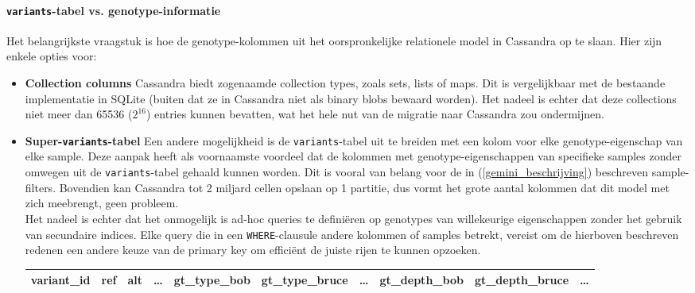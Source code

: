\paragraph{\texttt{variants}-tabel vs. genotype-informatie}

Het belangrijkste vraagstuk is hoe de genotype-kolommen uit het oorspronkelijke relationele model in Cassandra op te slaan. Hier zijn enkele opties voor:

\begin{itemize}

\item \textbf{Collection columns} Cassandra biedt zogenaamde collection types, zoals sets, lists of maps. Dit is vergelijkbaar met de bestaande implementatie in SQLite (buiten dat ze in Cassandra niet als binary blobs bewaard worden). Het nadeel is echter dat deze collections niet meer dan 65536 ($2^{16}$) entries kunnen bevatten, wat het hele nut van de migratie naar Cassandra zou ondermijnen.

\item \textbf{Super-\texttt{variants}-tabel} Een andere mogelijkheid is de \texttt{variants}-tabel uit te breiden met een kolom voor elke genotype-eigenschap van elke sample. Deze aanpak heeft als voornaamste voordeel dat de kolommen met genotype-eigenschappen van specifieke samples zonder omwegen uit de \texttt{variants}-tabel gehaald kunnen worden. Dit is vooral van belang voor de in (\ref{gemini_beschrijving}) beschreven sample-filters. Bovendien kan Cassandra tot 2 miljard cellen opslaan op 1 partitie, dus vormt het grote aantal kolommen dat dit model met zich meebrengt, geen probleem.\\
Het nadeel is echter dat het onmogelijk is ad-hoc queries te defini\"eren op genotypes van willekeurige eigenschappen zonder het gebruik van secundaire indices. Elke query die in een \texttt{WHERE}-clausule andere kolommen of samples betrekt, vereist om de hierboven beschreven redenen een andere keuze van de primary key om effici\"ent de juiste rijen te kunnen opzoeken.

\begin{table}[!htbp]
\begin{tabular}{@{}|l|l|l|l|l|l|l|l|l|l|@{}}
\toprule
variant\_id & ref & alt & \ldots & gt\_type\_bob & gt\_type\_bruce & \ldots & gt\_depth\_bob & gt\_depth\_bruce & \ldots \\ \bottomrule
\end{tabular}
\end{table}


\end{itemize}
